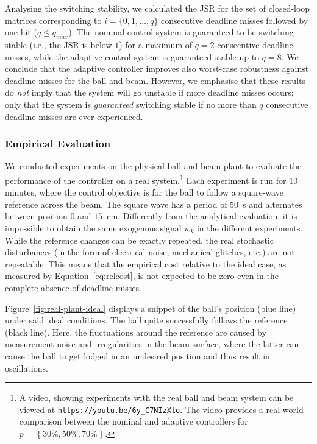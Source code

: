 Analysing the switching stability, we calculated the JSR for the set of closed-loop matrices corresponding to $i = \{0,1,\ldots,q\}$ consecutive deadline misses followed by one hit ($q \leq q_{max}$).
The nominal control system is guaranteed to be switching stable (i.e., the JSR is below $1$) for a maximum of $q=2$ consecutive deadline misses, while the adaptive control system is guaranteed stable up to $q=8$. 
We conclude that the adaptive controller improves also worst-case robustness against deadline misses for the ball and beam.
However, we emphasise that these results do \emph{not} imply that the system will go unstable if more deadline misses occurs; only that the system is \emph{guaranteed} switching stable if no more than $q$ consecutive deadline misses are ever experienced.

\subsubsection*{Empirical Evaluation}
We conducted experiments on the physical ball and beam plant to evaluate the performance of the controller on a real system.\footnote{A video, showing experiments with the real ball and beam system can be viewed at \texttt{https://youtu.be/6y\_C7NIzXto}. The video provides a real-world comparison between the nominal and adaptive controllers for $p = \left\{30\%, 50\%, 70\%\right\}$.}
Each experiment is run for $10$ minutes, where the control objective is for the ball to follow a square-wave reference across the beam.
The square wave has a period of $50$~s and alternates between position $0$ and $15$~cm.
Differently from the analytical evaluation, it is impossible to obtain the same exogenous signal $w_k$ in the different experiments.
While the reference changes can be exactly repeated, the real stochastic disturbances (in the form of electrical noise, mechanical glitches, etc.) are not repeatable.
This means that the empirical cost relative to the ideal case, as measured by Equation~\eqref{eq:relcost}, is not expected to be zero even in the complete absence of deadline misses.

Figure~\ref{fig:real-plant-ideal} displays a snippet of the ball's position (blue line) under said ideal conditions.
The ball quite successfully follows the reference (black line). 
Here, the fluctuations around the reference are caused by measurement noise and irregularities in the beam surface, where the latter can cause the ball to get lodged in an undesired position and thus result in oscillations.

